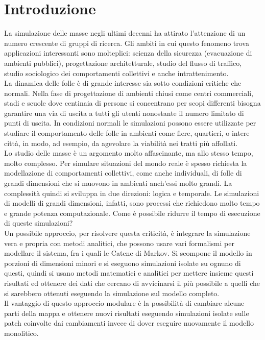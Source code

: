 \chapter{Introduzione}
La simulazione delle masse negli ultimi decenni ha attirato l'attenzione di un numero crescente di gruppi di ricerca. Gli ambiti in cui questo fenomeno trova applicazioni interessanti sono molteplici: scienza della sicurezza (evacuazione di ambienti pubblici), progettazione architetturale, studio del flusso di traffico, studio sociologico dei comportamenti collettivi e anche intrattenimento.\\
La dinamica delle folle è di grande interesse sia sotto condizioni critiche che normali. Nella fase di progettazione di ambienti chiusi come centri commerciali, stadi e scuole dove centinaia di persone si concentrano per scopi differenti bisogna garantire una via di uscita a tutti gli utenti nonostante il numero limitato di punti di uscita. In condizioni normali le simulazioni possono essere utilizzate per studiare il comportamento delle folle in ambienti come fiere, quartieri, o intere città, in modo, ad esempio, da agevolare la viabilità nei tratti più affollati.\\
Lo studio delle masse è un argomento molto affascinante, ma allo stesso tempo, molto complesso. Per simulare situazioni del mondo reale è spesso richiesta la modellazione di comportamenti collettivi, come anche individuali, di folle di grandi dimensioni che si muovono in ambienti anch'essi molto grandi. La complessità quindi si sviluppa in due direzioni: logica e temporale. Le simulazioni di modelli di grandi dimensioni, infatti, sono processi che richiedono molto tempo e grande potenza computazionale. Come è possibile ridurre il tempo di esecuzione di queste simulazioni? \\
Un possibile approccio, per risolvere questa criticità, è integrare la simulazione vera e propria con metodi analitici, che possono usare vari formalismi per modellare il sistema, fra i quali le Catene di Markov. Si scompone il modello in porzioni di dimensioni minori e si eseguono simulazioni isolate su ognuno di questi, quindi si usano metodi matematici e analitici per mettere insieme questi risultati ed ottenere dei dati che cercano di avvicinarsi il più possibile a quelli che si sarebbero ottenuti eseguendo la simulazione sul modello completo.\\
Il vantaggio di questo approccio modulare è la possibilità di cambiare alcune parti della mappa e ottenere nuovi risultati eseguendo simulazioni isolate sulle patch coinvolte dai cambiamenti invece di dover eseguire nuovamente il modello monolitico.\\

